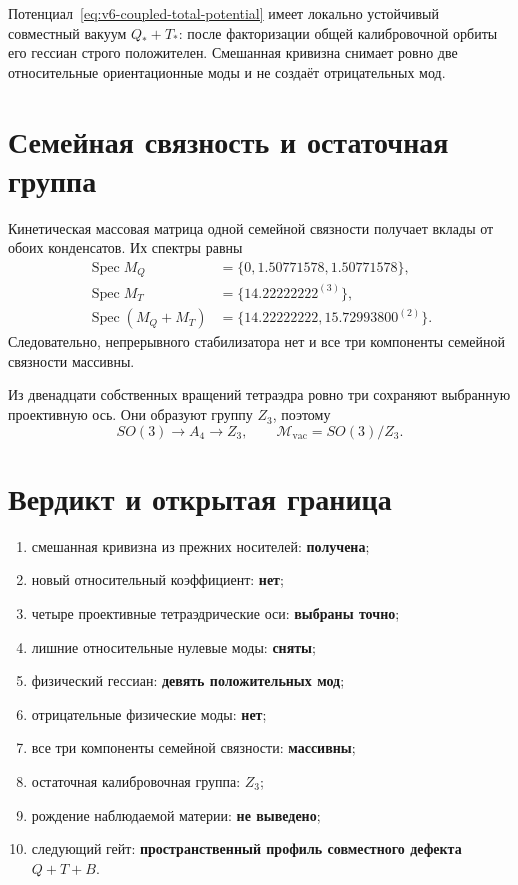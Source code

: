 \begin{theorem}
Потенциал~\eqref{eq:v6-coupled-total-potential} имеет локально устойчивый
совместный вакуум $Q_*+T_*$: после факторизации общей калибровочной
орбиты его гессиан строго положителен. Смешанная кривизна снимает ровно
две относительные ориентационные моды и не создаёт отрицательных мод.
\end{theorem}

\section{Семейная связность и остаточная группа}

Кинетическая массовая матрица одной семейной связности получает вклады
от обоих конденсатов. Их спектры равны
\begin{align}
 \operatorname{Spec}M_Q&=\{0,1.50771578,1.50771578\},\\
 \operatorname{Spec}M_T&=\{14.22222222^{(3)}\},\\
 \operatorname{Spec}(M_Q+M_T)&=
 \{14.22222222,15.72993800^{(2)}\}.
\end{align}
Следовательно, непрерывного стабилизатора нет и все три компоненты
семейной связности массивны.

Из двенадцати собственных вращений тетраэдра ровно три сохраняют
выбранную проективную ось. Они образуют группу $Z_3$, поэтому
\begin{equation}
 SO(3)\longrightarrow A_4\longrightarrow Z_3,
 \qquad
 \mathcal M_{\mathrm{vac}}=SO(3)/Z_3.
\end{equation}

\section{Вердикт и открытая граница}

\begin{protocol}
\begin{enumerate}
 \item смешанная кривизна из прежних носителей: \textbf{получена};
 \item новый относительный коэффициент: \textbf{нет};
 \item четыре проективные тетраэдрические оси: \textbf{выбраны точно};
 \item лишние относительные нулевые моды: \textbf{сняты};
 \item физический гессиан: \textbf{девять положительных мод};
 \item отрицательные физические моды: \textbf{нет};
 \item все три компоненты семейной связности: \textbf{массивны};
 \item остаточная калибровочная группа: \textbf{$Z_3$};
 \item рождение наблюдаемой материи: \textbf{не выведено};
 \item следующий гейт: \textbf{пространственный профиль совместного
 дефекта $Q+T+B$}.
\end{enumerate}
\end{protocol}

